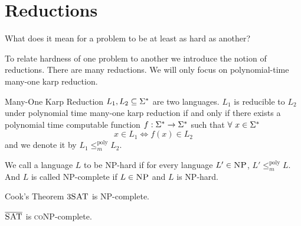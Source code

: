 \section{Reductions}
\begin{question}{}{}
    What does it mean for a problem to be at least as hard as another? 
\end{question}
To relate hardness of one problem to another we introduce the notion of reductions. There are many reductions. We will only focus on polynomial-time many-one karp reduction. 
\begin{Definition}{Many-One Karp Reduction}{}
$L_1,L_2\subseteq\Sigma^*$ are two languages. $L_1$ is reducible to $L_2$ under polynomial time many-one karp reduction if and only if there exists a polynomial time computable  function $f:\Sigma^*\to\Sigma^*$ such that $\forall\ x\in \Sigma^*$ $$x\in L_1\iff f(x)\in L_2$$ and we denote it by $L_1\leq_{m}^{\text{poly}} L_2$. 
\end{Definition}
We call a language $L$ to be \textsc{NP}-hard if for every language $L'\in\textsc{NP}$, $L'\leq_{m}^{\text{poly}}L$. And $L$ is called \textsc{NP}-complete if $L\in\textsc{NP}$ and $L$ is \textsc{NP}-hard. 
\begin{Theorem}{Cook's Theorem}{}
$3\textsc{SAT}$ is \textsc{NP}-complete.
\end{Theorem}
\begin{corolary}{}{}
    $\overline{\textsc{SAT}}$ is \textsc{coNP}-complete. 
\end{corolary}